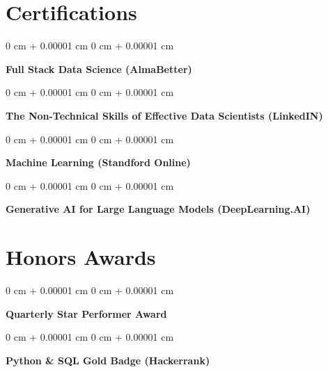 \documentclass[10pt, letterpaper]{article}
\newenvironment{onecolentry}{
    \begin{adjustwidth}{
        0 cm + 0.00001 cm
    }{
        0 cm + 0.00001 cm
    }
}{
    \end{adjustwidth}
} %
\newenvironment{twocolentry}[2][]{
    \onecolentry
    \def\secondColumn{#2}
    \setcolumnwidth{\fill, 4.2 cm}
    \begin{paracol}{2}
}{
    \switchcolumn \raggedleft \secondColumn
    \end{paracol}
    \endonecolentry
} %
\begin{document}
    
    \section{Certifications}



        
        \begin{onecolentry}
            \textbf{Full Stack Data Science (AlmaBetter)}\end{onecolentry}



        \vspace{0.15 cm}

        \begin{onecolentry}
            \textbf{The Non-Technical Skills of Effective Data Scientists (LinkedIN)}\end{onecolentry}



        \vspace{0.15 cm}

        \begin{onecolentry}
            \textbf{Machine Learning (Standford Online)}\end{onecolentry}



        \vspace{0.15 cm}

        \begin{onecolentry}
            \textbf{Generative AI for Large Language Models (DeepLearning.AI)}\end{onecolentry}




    
    \section{Honors Awards}



        
        \begin{twocolentry}{
            2024
        }
            \textbf{Quarterly Star Performer Award}\end{twocolentry}



        \vspace{0.15 cm}

        \begin{onecolentry}
            \textbf{Python \& SQL Gold Badge (Hackerrank)}\end{onecolentry}




    
\end{document}
